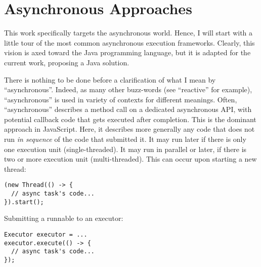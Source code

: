 
\chapter{Asynchronous Approaches}
\label{ch:asyncworld}


This work specifically targets the asynchronous world. Hence, I will start with a little tour of the most common asynchronous execution frameworks. Clearly, this vision is axed toward the Java programming language, but it is adapted for the current work, proposing a Java solution.

There is nothing to be done before a clarification of what I mean by ``asynchronous''. Indeed, as many other buzz-words (see ``reactive'' for example), ``asynchronous'' is used in variety of contexts for different meanings. Often, ``asynchronous'' describes a method call on a dedicated asynchronous API, with potential callback code that gets executed after completion. This is the dominant approach in JavaScript. Here, it describes more generally any code that does not run \emph{in sequence} of the code that submitted it. It may run later if there is only one execution unit (single-threaded). It may run in parallel or later, if there is two or more execution unit (multi-threaded). This can occur upon starting a new thread:

\begin{lstlisting}
(new Thread(() -> {
  // async task's code...
}).start();
\end{lstlisting}

Submitting a runnable to an executor:

\begin{lstlisting}
Executor executor = ...
executor.execute(() -> {
  // async task's code...
});
\end{lstlisting}

